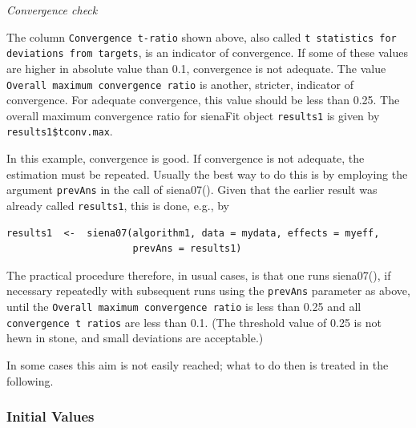 \documentclass[a4paper,fleqn,11pt]{article}
\newcommand{\+}{\, + \,}
\newcommand{\sfn}[1]{\textsf{#1}}
\begin{document}
\emph{Convergence check}
\smallskip

\noindent
The column \texttt{\small Convergence t-ratio} shown above, also
called \texttt{\small t statistics for deviations from targets},
is an indicator of convergence. If some of these values
are higher in absolute value than 0.1, convergence is not adequate.
The value \texttt{Overall maximum convergence ratio} is another, stricter,
indicator of convergence.
For adequate convergence, this value should be less than 0.25.
The overall maximum convergence ratio for \sfn{sienaFit} object \texttt{results1}
is given by  \texttt{results1\$tconv.max}.

In this example, convergence is good.
If convergence is not adequate, the estimation must be repeated.
Usually the best way to do this is by employing the
argument \texttt{prevAns} in the call of \sfn{siena07()}.
Given that the earlier result was already called \texttt{results1},
this is done, e.g., by
\begin{verbatim}
results1  <-  siena07(algorithm1, data = mydata, effects = myeff,
                      prevAns = results1)
\end{verbatim}
The practical procedure therefore, in usual cases, is that
one runs \sfn{siena07()}, if necessary repeatedly with
subsequent runs using the \texttt{prevAns} parameter as above,
until the \texttt{Overall maximum convergence ratio} is less than 0.25
and all  \texttt{\small convergence t ratios}
are less than 0.1.
(The threshold value of 0.25 is not hewn in stone,
and small deviations are acceptable.)

In some cases this aim is not easily reached;
what to do then is treated in the following.

\subsubsection{Initial Values}
\label{S_initials}
\end{document}
